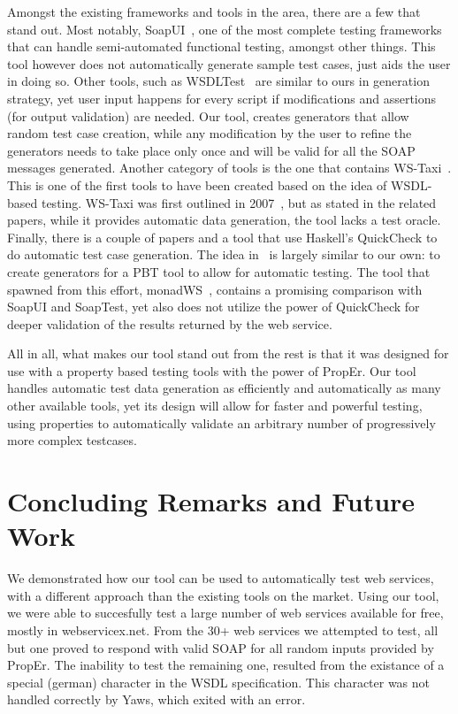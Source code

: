 \documentclass[submission,copyright]{eptcs}
\begin{document}
Amongst the existing frameworks and tools in the area, there are a few that 
stand out. 
Most notably, SoapUI~\cite{soapUI}, one of the most complete testing frameworks
that can handle semi-automated functional testing, amongst other things. This 
tool however does not automatically generate sample test cases, just aids the
user in doing so.
Other tools, such as WSDLTest~\cite{wsdltest@IEEE06} are similar to ours in 
generation strategy, yet user input happens for every script if modifications 
and assertions (for output validation) are needed. Our tool, creates generators 
that allow random test case creation, while any modification by the user to
refine the generators needs to take place only once and will be valid for all
the SOAP messages generated.
Another category of tools is the one that contains WS-Taxi~\cite{taxi@IC-08}. 
This is one of the first tools to have been created based on the idea
of WSDL-based testing. WS-Taxi was first outlined in
2007~\cite{partition@AST-07}, but as stated in the related papers,
while it provides automatic data generation, the tool lacks a test oracle.
%
Finally, there is a couple of papers and a tool that use Haskell's
QuickCheck to do automatic test case generation. The idea
in~\cite{ws_quickcheck} is largely similar to our own: to create
generators for a PBT tool to allow for automatic testing. The tool
that spawned from this effort, monadWS~\cite{monadWS@AST-11}, contains
a promising comparison with SoapUI and SoapTest, yet also does not
utilize the power of QuickCheck for deeper validation of the results
returned by the web service.

All in all, what makes our tool stand out from the rest is that it 
was designed for use with a property based testing tools with the 
power of PropEr. Our tool handles automatic test data generation as
efficiently and automatically as many other available tools, yet its
design will allow for faster and powerful testing, using properties 
to automatically validate an arbitrary number of progressively more 
complex testcases.

\section{Concluding Remarks and Future Work}

We demonstrated how our tool can be used to automatically test web services, 
with a different approach than the existing tools on the market. Using our 
tool, we were able to succesfully test a large number of web services 
available for free, mostly in webservicex.net. From the 30+ web services we 
attempted to test, all but one proved to respond with valid SOAP for all random 
inputs provided by PropEr. The inability to test the remaining one, resulted 
from the existance of a special (german) character in the WSDL specification.
This character was not handled correctly by Yaws, which exited with an error. 
\end{document}
